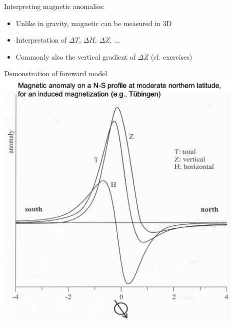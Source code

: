 \begin{frame}
  \begin{PointSix}{Interpreting magnetic anomalies:}
    \begin{itemize}
      \item Unlike in gravity, magnetic can be measured in 3D
      \item Interpretation of $\Delta T$, $\Delta H$, $\Delta Z$, ...
      \item Commonly also the vertical gradient of $\Delta Z$ (cf. exercises)
    \end{itemize}
  \end{PointSix}
\end{frame}

\begin{frame}
  \begin{PointSix}{Demonstration of foreward model}
    \includegraphics[width=0.9\textwidth]{Figures/Magnetics/MagneticAnomalyAllComponents.png}


  \end{PointSix}
\end{frame}


